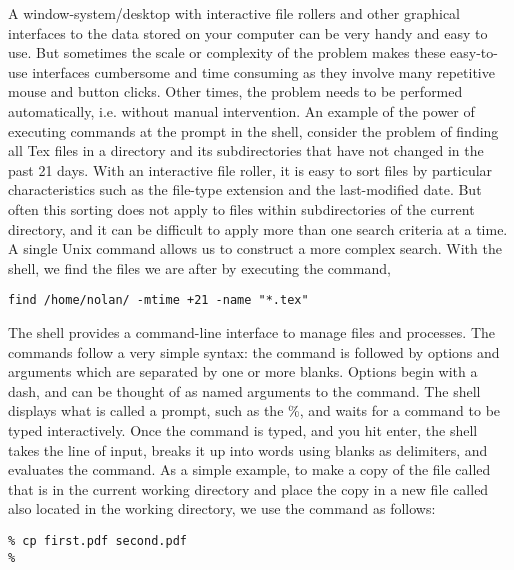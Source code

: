 A window-system/desktop with interactive file rollers and other graphical interfaces
to the data stored on your computer can be very handy and easy to use.
But sometimes the scale or complexity of the problem makes these
easy-to-use interfaces cumbersome and time consuming as they involve
many repetitive mouse and button clicks. Other times, the problem needs
to be performed automatically, i.e. without manual intervention.
An example of the power of executing
commands at the prompt in the shell, consider the problem of finding all Tex files in a
directory and its subdirectories that have not changed in the past 21 days.
With an interactive file roller, it is easy to sort files by
particular characteristics such as the file-type extension and the
last-modified date.  But often this sorting does not apply to files
within subdirectories of the current directory, and it can be
difficult to apply more than one search criteria at a time.
A single Unix command allows us to construct a more complex search.
With the shell, we find the files we are after by executing the command, 
\begin{verbatim}
find /home/nolan/ -mtime +21 -name "*.tex"
\end{verbatim}


The shell provides a command-line interface to manage files and
processes.  The commands follow a very simple syntax: the command is
followed by options and arguments which are separated by one or more
blanks.  Options begin with a dash, and can be thought of as named
arguments to the command.  The shell displays what is called a prompt,
such as the \%, and waits for a command to be typed interactively. Once
the command is typed, and you hit enter, the shell takes the line of
input, breaks it up into words using blanks as delimiters, and evaluates the
command.  As a simple example, to make a copy of the file called
 that is in the current working directory and place
the copy in a new file called  also located in the working
directory, we use the  command as follows: 
\begin{verbatim}
% cp first.pdf second.pdf
% 
\end{verbatim}


